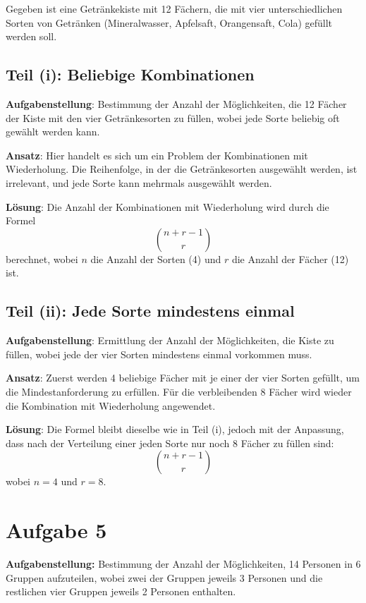 \documentclass{article}
\begin{document}
Gegeben ist eine Getränkekiste mit 12 Fächern, die mit vier unterschiedlichen Sorten von Getränken (Mineralwasser, Apfelsaft, Orangensaft, Cola) gefüllt werden soll.

\subsection*{Teil (i): Beliebige Kombinationen}

\textbf{Aufgabenstellung}: Bestimmung der Anzahl der Möglichkeiten, die 12 Fächer der Kiste mit den vier Getränkesorten zu füllen, wobei jede Sorte beliebig oft gewählt werden kann.

\textbf{Ansatz}: Hier handelt es sich um ein Problem der Kombinationen mit Wiederholung. Die Reihenfolge, in der die Getränkesorten ausgewählt werden, ist irrelevant, und jede Sorte kann mehrmals ausgewählt werden.

\textbf{Lösung}: Die Anzahl der Kombinationen mit Wiederholung wird durch die Formel
\[
	\binom{n + r - 1}{r}
\]
berechnet, wobei \( n \) die Anzahl der Sorten (4) und \( r \) die Anzahl der Fächer (12) ist.

\subsection*{Teil (ii): Jede Sorte mindestens einmal}

\textbf{Aufgabenstellung}: Ermittlung der Anzahl der Möglichkeiten, die Kiste zu füllen, wobei jede der vier Sorten mindestens einmal vorkommen muss.

\textbf{Ansatz}: Zuerst werden 4 beliebige Fächer mit je einer der vier Sorten gefüllt, um die Mindestanforderung zu erfüllen. Für die verbleibenden 8 Fächer wird wieder die Kombination mit Wiederholung angewendet.

\textbf{Lösung}: Die Formel bleibt dieselbe wie in Teil (i), jedoch mit der Anpassung, dass nach der Verteilung einer jeden Sorte nur noch 8 Fächer zu füllen sind:
\[
	\binom{n + r - 1}{r}
\]
wobei \( n = 4 \) und \( r = 8 \).


\section*{Aufgabe 5}

\textbf{Aufgabenstellung:} Bestimmung der Anzahl der Möglichkeiten, 14 Personen in 6 Gruppen aufzuteilen, wobei zwei der Gruppen jeweils 3 Personen und die restlichen vier Gruppen jeweils 2 Personen enthalten.
\end{document}

